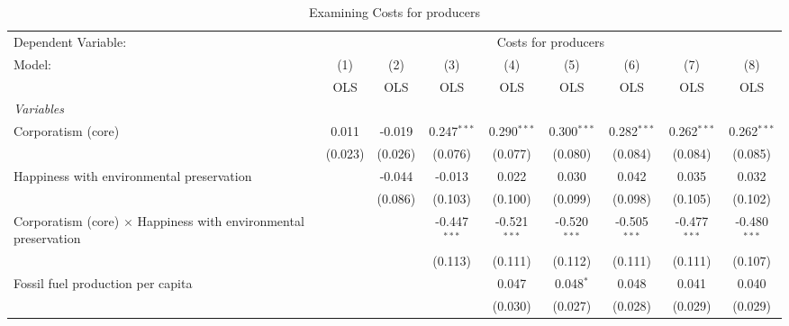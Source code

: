 
\begin{table}[htbp]
   \caption{Examining Costs for producers}
   \centering
   \begin{tabular}{lcccccccc}
      \toprule
      Dependent Variable: & \multicolumn{8}{c}{Costs for producers}\\
      Model:                                                                 & (1)     & (2)     & (3)            & (4)            & (5)            & (6)            & (7)            & (8)\\  
                                                                             &  OLS    & OLS     & OLS            & OLS            & OLS            & OLS            & OLS            & OLS\\  
      \midrule
      \emph{Variables}\\
      Corporatism (core)                                                     & 0.011   & -0.019  & 0.247$^{***}$  & 0.290$^{***}$  & 0.300$^{***}$  & 0.282$^{***}$  & 0.262$^{***}$  & 0.262$^{***}$\\   
                                                                             & (0.023) & (0.026) & (0.076)        & (0.077)        & (0.080)        & (0.084)        & (0.084)        & (0.085)\\   
      Happiness with environmental preservation                              &         & -0.044  & -0.013         & 0.022          & 0.030          & 0.042          & 0.035          & 0.032\\   
                                                                             &         & (0.086) & (0.103)        & (0.100)        & (0.099)        & (0.098)        & (0.105)        & (0.102)\\   
      Corporatism (core) $\times$ Happiness with environmental preservation  &         &         & -0.447$^{***}$ & -0.521$^{***}$ & -0.520$^{***}$ & -0.505$^{***}$ & -0.477$^{***}$ & -0.480$^{***}$\\   
                                                                             &         &         & (0.113)        & (0.111)        & (0.112)        & (0.111)        & (0.111)        & (0.107)\\   
      Fossil fuel production per capita                                      &         &         &                & 0.047          & 0.048$^{*}$    & 0.048          & 0.041          & 0.040\\   
                                                                             &         &         &                & (0.030)        & (0.027)        & (0.028)        & (0.029)        & (0.029)\\   

\end{tabular}
\end{table}
